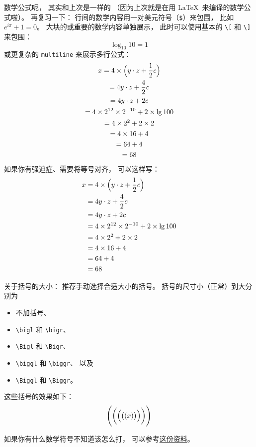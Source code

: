 \documentclass{article}
\def\code{\lstinline}
\begin{document}
数学公式呢，
其实和上次是一样的
（因为上次就是在用 \LaTeX\ 来编译的数学公式啦）。
再复习一下：
行间的数学内容用一对美元符号（\code`$`）来包围，
比如 $e^{i\pi} + 1 = 0$。
大块的或重要的数学内容单独展示，
此时可以使用基本的 \code`\[` 和 \code`\]` 来包围：
\[
    \log_{10} 10 = 1
\]
或更复杂的 \code `multiline` 来展示多行公式：
\begin{multline*}
    x = 4 \times \Bigl( y \cdot z + \frac{1}{2} c \Bigr) \\
      = 4 y \cdot z + \frac{4}{2} c \\
      = 4 y \cdot z + 2 c \\
      = 4 \times 2^{12} \times 2^{-10} + 2 \times \lg 100 \\
      = 4 \times 2^2 + 2 \times 2 \\
      = 4 \times 16 + 4 \\
      = 64 + 4 \\
      = 68
\end{multline*}
如果你有强迫症、需要将等号对齐，
可以这样写：
\[
    \begin{split}
        x &= 4 \times \Bigl( y \cdot z + \frac{1}{2} c \Bigr) \\
          &= 4 y \cdot z + \frac{4}{2} c \\
          &= 4 y \cdot z + 2 c \\
          &= 4 \times 2^{12} \times 2^{-10} + 2 \times \lg 100 \\
          &= 4 \times 2^2 + 2 \times 2 \\
          &= 4 \times 16 + 4 \\
          &= 64 + 4 \\
          &= 68
    \end{split}
\]

关于括号的大小：
推荐手动选择合适大小的括号。
括号的尺寸小（正常）到大分别为
\begin{itemize}
\item
    不加括号、
\item
    \code`\bigl` 和 \code`\bigr`、
\item
    \code`\Bigl` 和 \code`\Bigr`、
\item
    \code`\biggl` 和 \code`\biggr`、
    以及
\item
    \code`\Biggl` 和 \code`\Biggr`。
\end{itemize}
这些括号的效果如下：
\[
    \Biggl(\biggl(\Bigl(\bigl((x)\bigr)\Bigr)\biggr)\Biggr)
\]

如果你有什么数学符号不知道该怎么打，
可以参考\href{http://web.mit.edu/rsi/www/pdfs/math-symbols.pdf}{这份资料}。
\end{document}
